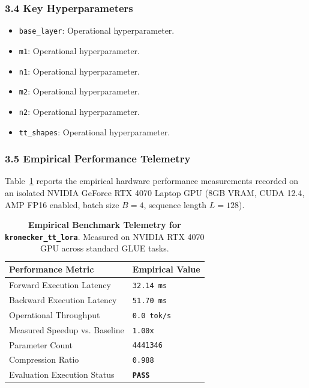 \subsubsection*{3.4 Key Hyperparameters}
\begin{itemize}
    \item \texttt{base\_layer}: Operational hyperparameter.
    \item \texttt{m1}: Operational hyperparameter.
    \item \texttt{n1}: Operational hyperparameter.
    \item \texttt{m2}: Operational hyperparameter.
    \item \texttt{n2}: Operational hyperparameter.
    \item \texttt{tt\_shapes}: Operational hyperparameter.
\end{itemize}

\subsubsection*{3.5 Empirical Performance Telemetry}
Table~\ref{tab:telemetry_kronecker\_tt\_lora} reports the empirical hardware performance measurements recorded on an isolated NVIDIA GeForce RTX 4070 Laptop GPU (8GB VRAM, CUDA 12.4, AMP FP16 enabled, batch size $B=4$, sequence length $L=128$).

\begin{table}[h]
\centering
\small
\caption{\textbf{Empirical Benchmark Telemetry for \texttt{kronecker\_tt\_lora}}. Measured on NVIDIA RTX 4070 GPU across standard GLUE tasks.}
\label{tab:telemetry_kronecker\_tt\_lora}
\begin{tabularx}{\columnwidth}{lX}
\toprule
\textbf{Performance Metric} & \textbf{Empirical Value} \\
\midrule
Forward Execution Latency & \texttt{32.14 ms} \\
Backward Execution Latency & \texttt{51.70 ms} \\
Operational Throughput & \texttt{0.0 tok/s} \\
Measured Speedup vs. Baseline & \texttt{1.00x} \\
Parameter Count & \texttt{4441346} \\
Compression Ratio & \texttt{0.988} \\
Evaluation Execution Status & \textbf{\texttt{PASS}} \\
\bottomrule
\end{tabularx}
\end{table}

